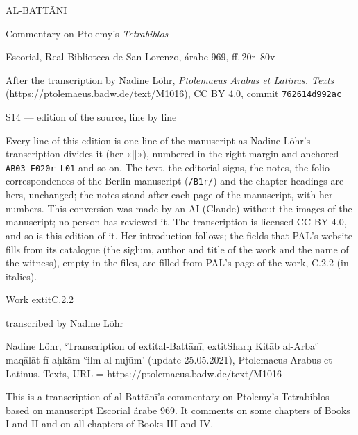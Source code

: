 \documentclass[11pt]{article}
\begin{document}
\thispagestyle{empty}
\begin{center}\Large AL-BATTĀNĪ\par\vspace{4mm}\LARGE Commentary on Ptolemy’s \textit{Tetrabiblos}\par\vspace{3mm}\large{}\par\vspace{5mm}\large Escorial, Real Biblioteca de San Lorenzo, árabe 969, ff.\,20r–80v\par\vspace{6mm}\normalsize After the transcription by Nadine Löhr, \textit{Ptolemaeus Arabus et Latinus. Texts}\\(https://ptolemaeus.badw.de/text/M1016), CC BY 4.0, commit \texttt{762614d992ac}\par\vspace{4mm}\large S14 --- edition of the source, line by line\end{center}\vspace{6mm}
\noindent Every line of this edition is one line of the manuscript as Nadine Löhr’s transcription divides it (her «||»), numbered in the right margin and anchored \texttt{AB03-F020r-L01} and so on. The text, the editorial signs, the notes, the folio correspondences of the Berlin manuscript (\texttt{/B1r/}) and the chapter headings are hers, unchanged; the notes stand after each page of the manuscript, with her numbers. This conversion was made by an AI (Claude) without the images of the manuscript; no person has reviewed it. The transcription is licensed CC BY 4.0, and so is this edition of it. Her introduction follows; the fields that PAL’s website fills from its catalogue (the siglum, author and title of the work and the name of the witness), empty in the files, are filled from PAL’s page of the work, C.2.2 (in italics).\par\medskip\sloppy
\par\smallskip\noindent Work 	extit{C.2.2}
\par\smallskip\noindent transcribed by Nadine Löhr
\par\smallskip\noindent Nadine Löhr, ‘Transcription of 	extit{al-Battānī}, 	extit{Sharḥ Kitāb al-Arbaʿ maqālāt fī aḥkām ʿilm al-nujūm}’ (update 25.05.2021), Ptolemaeus Arabus et Latinus. Texts, URL = https://ptolemaeus.badw.de/text/M1016
\par\smallskip\noindent This is a transcription of al-Battānī’s commentary on Ptolemy’s Tetrabiblos based on manuscript Escorial árabe 969. It comments on some chapters of Books I and II and on all chapters of Books III and IV.
\end{document}

